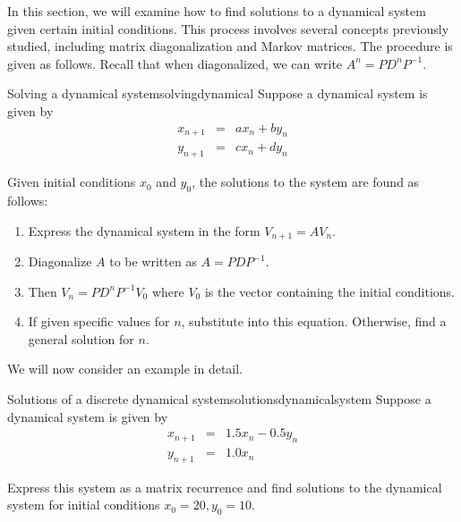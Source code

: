 In this section, we will examine how to find solutions to a dynamical system given certain initial conditions. This process involves several concepts previously studied, including matrix diagonalization and Markov matrices. The procedure is given as follows. Recall that when diagonalized, we can write $A^{n} = PD^{n}P^{-1}$. 

\begin{procedure}{Solving a dynamical system}{solvingdynamical}
Suppose a dynamical system is given by  
\begin{eqnarray*}
x_{n+1} &=& a x_n + b y_n \\
y_{n+1} &=& c x_n + d y_n
\end{eqnarray*}

Given initial conditions $x_0$ and $y_0$, the solutions to the system are found as follows:
\begin{enumerate}
\item
Express the dynamical system in the form $V_{n+1} = AV_n$.
\item
Diagonalize $A$ to be written as $A = PDP^{-1}$.
\item 
Then $V_{n} = PD^{n} P^{-1} V_{0}$ where $V_{0}$ is the vector containing the initial conditions. 
\item
If given specific values for $n$, substitute into this equation. Otherwise, find a general solution for $n$.
\end{enumerate}
\end{procedure}

We will now consider an example in detail.

\begin{example}{Solutions of a discrete dynamical system}{solutionsdynamicalsystem}
Suppose a dynamical system is given by 
\begin{eqnarray*}
x_{n+1} &=& 1.5 x_n - 0.5y_n\\
y_{n+1} &=& 1.0 x_n
\end{eqnarray*}

Express this system as a matrix recurrence and find solutions to the dynamical system for initial conditions $x_0=20, y_0=10$. 
\end{example}

